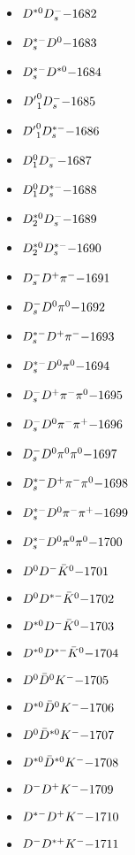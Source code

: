 \begin{multicols}{3}
\begin{itemize}
 \item $ D^{*0} D_{s}^{-} \hfill{-1682}$
 \item $ D_{s}^{*-} D^{0} \hfill{-1683}$
 \item $ D_{s}^{*-} D^{*0} \hfill{-1684}$
 \item $ {D^{\prime}}_{1}^{0} D_{s}^{-} \hfill{-1685}$
 \item $ {D^{\prime}}_{1}^{0} D_{s}^{*-} \hfill{-1686}$
 \item $ D_{1}^{0} D_{s}^{-} \hfill{-1687}$
 \item $ D_{1}^{0} D_{s}^{*-} \hfill{-1688}$
 \item $ D_{2}^{*0} D_{s}^{-} \hfill{-1689}$
 \item $ D_{2}^{*0} D_{s}^{*-} \hfill{-1690}$
 \item $ D_{s}^{-} D^{+} \pi^{-} \hfill{-1691}$
 \item $ D_{s}^{-} D^{0} \pi^{0} \hfill{-1692}$
 \item $ D_{s}^{*-} D^{+} \pi^{-} \hfill{-1693}$
 \item $ D_{s}^{*-} D^{0} \pi^{0} \hfill{-1694}$
 \item $ D_{s}^{-} D^{+} \pi^{-} \pi^{0} \hfill{-1695}$
 \item $ D_{s}^{-} D^{0} \pi^{-} \pi^{+} \hfill{-1696}$
 \item $ D_{s}^{-} D^{0} \pi^{0} \pi^{0} \hfill{-1697}$
 \item $ D_{s}^{*-} D^{+} \pi^{-} \pi^{0} \hfill{-1698}$
 \item $ D_{s}^{*-} D^{0} \pi^{-} \pi^{+} \hfill{-1699}$
 \item $ D_{s}^{*-} D^{0} \pi^{0} \pi^{0} \hfill{-1700}$
 \item $ D^{0} D^{-} \bar{K}^{0} \hfill{-1701}$
 \item $ D^{0} D^{*-} \bar{K}^{0} \hfill{-1702}$
 \item $ D^{*0} D^{-} \bar{K}^{0} \hfill{-1703}$
 \item $ D^{*0} D^{*-} \bar{K}^{0} \hfill{-1704}$
 \item $ D^{0} \bar{D}^{0} K^{-} \hfill{-1705}$
 \item $ D^{*0} \bar{D}^{0} K^{-} \hfill{-1706}$
 \item $ D^{0} \bar{D}^{*0} K^{-} \hfill{-1707}$
 \item $ D^{*0} \bar{D}^{*0} K^{-} \hfill{-1708}$
 \item $ D^{-} D^{+} K^{-} \hfill{-1709}$
 \item $ D^{*-} D^{+} K^{-} \hfill{-1710}$
 \item $ D^{-} D^{*+} K^{-} \hfill{-1711}$

\end{itemize}
\end{multicols}
